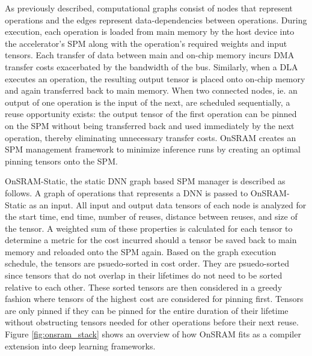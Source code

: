 
As previously described, computational graphs consist of nodes that represent
operations and the edges represent data-dependencies between operations. During
execution, each operation is loaded from main memory by the host device into
the accelerator's SPM along with the operation's required weights and input
tensors. Each transfer of data between main and on-chip memory incurs DMA
transfer costs exacerbated by the bandwidth of the bus. Similarly, when a DLA
executes an operation, the resulting output tensor is placed onto on-chip
memory and again transferred back to main memory. When two connected nodes,
ie. an output of one operation is the input of the next, are scheduled
sequentially, a reuse opportunity exists: the output tensor of the first
operation can be pinned on the SPM without being transferred back and used
immediately by the next operation, thereby eliminating unnecessary transfer
costs. OnSRAM creates an SPM management framework to minimize inference runs
by creating an optimal pinning tensors onto the SPM.

OnSRAM-Static, the static DNN graph based SPM manager is described as follows.
A graph of operations that represents a DNN is passed to OnSRAM-Static as an
input. All input and output data tensors of each node is analyzed for the start
time, end time, number of reuses, distance between reuses, and size of the
tensor. A weighted sum of these properties is calculated for each tensor to
determine a metric for the cost incurred should a tensor be saved back to main
memory and reloaded onto the SPM again. Based on the graph execution schedule,
the tensors are psuedo-sorted in cost order. They are psuedo-sorted since
tensors that do not overlap in their lifetimes do not need to be sorted relative to
each other. These sorted tensors are then considered in a greedy fashion where
tensors of the highest cost are considered for pinning first. Tensors are only
pinned if they can be pinned for the entire duration of their lifetime without
obstructing tensors needed for other operations before their next reuse. Figure
\ref{fig:onsram_stack} shows an overview of how OnSRAM fits as a compiler extension
into deep learning frameworks.

